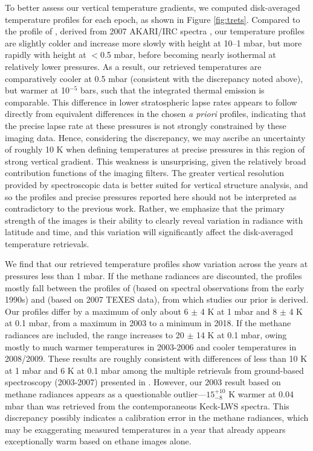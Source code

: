 \documentclass[twocolumn,10pt]{aastex631}
\begin{document}
To better assess our vertical temperature gradients, we computed disk-averaged temperature profiles for each epoch, as shown in Figure \ref{fig:trets}. Compared to the profile of \citet{fletcher2014neptune}, derived from 2007 AKARI/IRC spectra \citep{fletcher2010neptune}, our temperature profiles are slightly colder and increase more slowly with height at 10--1 mbar, but more rapidly with height at $<$0.5 mbar, before becoming nearly isothermal at relatively lower pressures.  As a result, our retrieved temperatures are comparatively cooler at 0.5 mbar (consistent with the discrepancy noted above), but warmer at 10$^{-5}$ bars, such that the integrated thermal emission is comparable. This difference in lower stratospheric lapse rates appears to follow directly from equivalent differences in the chosen \textit{a priori} profiles, indicating that the precise lapse rate at these pressures is not strongly constrained by these imaging data. Hence, considering the discrepancy, we may ascribe an uncertainty of roughly 10 K when defining temperatures at precise pressures in this region of strong vertical gradient.  This weakness is unsurprising, given the relatively broad contribution functions of the imaging filters. The greater vertical resolution provided by spectroscopic data is better suited for vertical structure analysis, and so the profiles and precise pressures reported here should not be interpreted as contradictory to the previous work. Rather, we emphasize that the primary strength of the images is their ability to clearly reveal variation in radiance with latitude and time, and this variation will significantly affect the disk-averaged temperature retrievals. 

We find that our retrieved temperature profiles show variation across the years at pressures less than 1 mbar. If the methane radiances are discounted, the profiles mostly fall between the profiles of \citet{moses2005photochemistry} (based on spectral observations from the early 1990s) and \citet{greathouse2011spatially} (based on 2007 TEXES data), from which studies our prior is derived. Our profiles differ by a maximum of only about 6 $\pm$ 4 K at 1 mbar and 8 $\pm$ 4 K at 0.1 mbar, from a maximum in 2003 to a minimum in 2018.  If the methane radiances are included, the range increases to 20 $\pm$ 14 K at 0.1 mbar, owing mostly to much warmer temperatures in 2003-2006 and cooler temperatures in 2008/2009. These results are roughly consistent with differences of less than 10 K at 1 mbar and 6 K at 0.1 mbar among the multiple retrievals from ground-based spectroscopy (2003-2007) presented in \citet{fletcher2014neptune}. However, our 2003 result based on methane radiances appears as a questionable outlier---$15^{+10}_{-8}$ K warmer at 0.04 mbar than was retrieved from the contemporaneous Keck-LWS spectra. This discrepancy possibly indicates a calibration error in the methane radiances, which may be exaggerating measured temperatures in a year that already appears exceptionally warm based on ethane images alone. 
\end{document}
